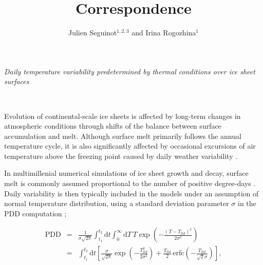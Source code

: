 \documentclass[review]{igs}
\begin{document}
\title[Correspondence]{Correspondence}
\author[Seguinot and Rogozhina]{Julien Seguinot$^{1,2,3}$ and Irina Rogozhina$^1$}

\maketitle


\emph{Daily temperature variability predetermined by thermal conditions over ice sheet surfaces}

~

Evolution of continental-scale ice sheets is affected by long-term changes in atmospheric conditions through shifts of the balance between surface accumulation and melt. Although surface melt primarily follows the annual temperature cycle, it is also significantly affected by occasional excursions of air temperature above the freezing point caused by daily weather variability \citep{arnold-mackay-1964}.

In multimillenial numerical simulations of ice sheet growth and decay, surface melt is commonly assumed proportional to the number of positive degree-days \citep[PDD;][]{hock-2003}. Daily variability is then typically included in the models under an assumption of normal temperature distribution, using a standard deviation parameter $\sigma$ in the PDD computation \citep{braithwaite-1984,reeh-1991,calov-greve-2005};

\begin{eqnarray} \label{eq:pdd}
    \mathrm{PDD} &=& \frac{1}{\sigma\sqrt{2\pi}}
        \int_{t_1}^{t_2} \mathrm{d}t
        \int_{0}^{\infty} \mathrm{d}T \,
        T \exp\left({-\frac{(T-T_{ltd})^2}{2\sigma^2}}\right)\\
    &=& \int_{t_1}^{t_2} \mathrm{d}t
        \left[\frac{\sigma}{\sqrt{2\pi}} \exp\left({-\frac{T_{ltd}^2}{2\sigma^2}}\right)
        + \frac{T_{ltd}}{2} \, \mathrm{erfc} \left(-\frac{T_{ltd}}{\sqrt{2}\sigma}\right)\right],
\end{eqnarray}
\end{document}
